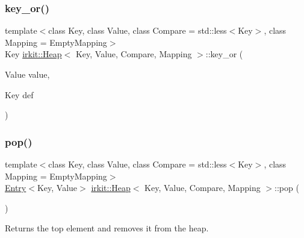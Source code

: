 \mbox{\label{classirkit_1_1Heap_a2fffaaf281662d57d13dcc1b0618dc0d}} 
\subsubsection{\texorpdfstring{key\+\_\+or()}{key\_or()}}
{\footnotesize\ttfamily template$<$class Key, class Value, class Compare = std\+::less$<$\+Key$>$, class Mapping = Empty\+Mapping$>$ \\
Key \mbox{\hyperlink{classirkit_1_1Heap}{irkit\+::\+Heap}}$<$ Key, Value, Compare, Mapping $>$\+::key\+\_\+or (\begin{DoxyParamCaption}\item[{Value}]{value,  }\item[{Key}]{def }\end{DoxyParamCaption})\hspace{0.3cm}{\ttfamily [inline]}}

\mbox{\label{classirkit_1_1Heap_afd4759dce1fe72d513e4b8e7766ec94e}} 
\subsubsection{\texorpdfstring{pop()}{pop()}}
{\footnotesize\ttfamily template$<$class Key, class Value, class Compare = std\+::less$<$\+Key$>$, class Mapping = Empty\+Mapping$>$ \\
\mbox{\hyperlink{structirkit_1_1Entry}{Entry}}$<$Key, Value$>$ \mbox{\hyperlink{classirkit_1_1Heap}{irkit\+::\+Heap}}$<$ Key, Value, Compare, Mapping $>$\+::pop (\begin{DoxyParamCaption}{ }\end{DoxyParamCaption})\hspace{0.3cm}{\ttfamily [inline]}}



Returns the top element and removes it from the heap. 

\mbox{\label{classirkit_1_1Heap_aa94f791b5b26659cc41a39fd58d138e4}} 
